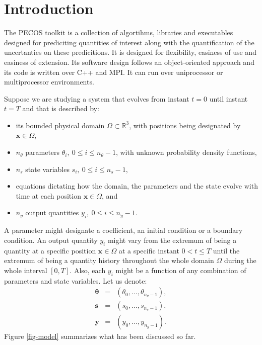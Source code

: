 \chapter{Introduction}\label{ch-int}
\thispagestyle{headings}

The PECOS toolkit is a collection of algortihms, libraries and executables designed for prediciting quantities of interest along with the quantification of the uncertanties on these predicitions.
It is designed for flexibility, easiness of use and easiness of extension.
Its software design follows an object-oriented approach and
its code is written over C++ and MPI.
It can run over uniprocessor or multiprocessor environments.

Suppose we are studying a system that evolves from instant $t=0$ until instant $t=T$ and
that is described by:
\begin{itemize}
\item its bounded physical domain $\Omega\subset\mathbb{R}^3$, with positions being designated by $\mathbf{x}\in\Omega$,
\item $n_{\theta}$ parameters $\theta_i,~0\leqslant i\leqslant n_{\theta}-1$, with unknown probability density functions,
\item $n_{s}$ state variables $s_i,~0\leqslant i\leqslant n_{s}-1$,
\item equations dictating how the domain, the parameters and the state evolve with time at each position $\mathbf{x}\in\Omega$, and
\item $n_{y}$ output quantities $y_i,~0\leqslant i\leqslant n_{y}-1$.
\end{itemize}
A parameter might designate a coefficient, an initial condition or a boundary condition.
An output quantity $y_i$ might vary from the extremum of being a quantity at a specific position $\mathbf{x}\in\Omega$ at a specific instant $0< t\leqslant T$
until the extremum of being a quantity history throughout the whole domain $\Omega$ during the whole interval $[0,T]$.
Also, each $y_i$ might be a function of any combination of parameters and state variables.
Let us denote:
\begin{eqnarray*}
\boldsymbol{\theta} & = & (\theta_0,\ldots,\theta_{n_\theta-1}), \\
\mathbf{s}          & = & (s_0,     \ldots,s_{n_s-1}          ), \\
\mathbf{y}          & = & (y_0,     \ldots,y_{n_y-1}          ).
\end{eqnarray*}
Figure \ref{fig-model} summarizes what has been discussed so far.

